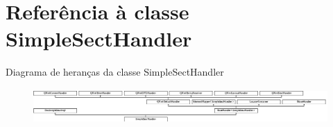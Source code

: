 \hypertarget{class_simple_sect_handler}{\section{Referência à classe Simple\-Sect\-Handler}
\label{class_simple_sect_handler}
}
Diagrama de heranças da classe Simple\-Sect\-Handler\begin{figure}[H]
\begin{center}
\leavevmode
\includegraphics[height=1.338912cm]{class_simple_sect_handler}
\end{center}
\end{figure}
